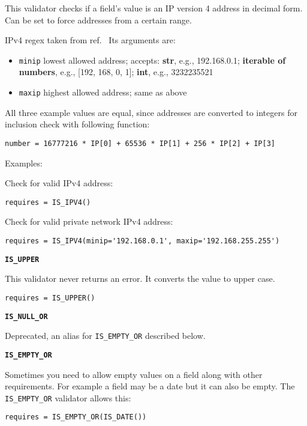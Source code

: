 \documentclass[justified,sixbynine,notoc]{tufte-book}
\def\ft{\small\tt}
\def\inxx#1{\index{#1}}
\begin{document}
\begin{fullwidth}
This validator checks if a field's value is an IP version 4 address in decimal form. Can
be set to force addresses from a certain range.

IPv4 regex taken from ref.~\cite{regexlib}
Its arguments are:
\begin{itemize}
\item {\ft minip} lowest allowed address; accepts: {\bf str}, e.g., 192.168.0.1; {\bf iterable of numbers}, e.g., [192, 168, 0, 1]; {\bf int}, e.g., 3232235521

\item {\ft maxip} highest allowed address; same as above
\end{itemize}

All three example values are equal, since addresses are converted to
integers for inclusion check with following function:
\begin{lstlisting}
number = 16777216 * IP[0] + 65536 * IP[1] + 256 * IP[2] + IP[3]
\end{lstlisting}

Examples:

Check for valid IPv4 address:
\begin{lstlisting}
requires = IS_IPV4()
\end{lstlisting}

Check for valid private network IPv4 address:
\begin{lstlisting}
requires = IS_IPV4(minip='192.168.0.1', maxip='192.168.255.255')
\end{lstlisting}

{\bf {\ft IS\_UPPER}}

\inxx{IS\_UPPER}

This validator never returns an error. It converts the value to upper case.
\begin{lstlisting}
requires = IS_UPPER()
\end{lstlisting}

{\bf {\ft IS\_NULL\_OR}}

\inxx{IS\_NULL\_OR}

Deprecated, an alias for {\ft IS\_EMPTY\_OR} described below.

{\bf {\ft IS\_EMPTY\_OR}}

\inxx{IS\_EMPTY\_OR}

Sometimes you need to allow empty values on a field along with other requirements. For example a field may be a date but it can also be empty.
The {\ft IS\_EMPTY\_OR} validator allows this:
\begin{lstlisting}
requires = IS_EMPTY_OR(IS_DATE())
\end{lstlisting}


\end{fullwidth}
\end{document}
